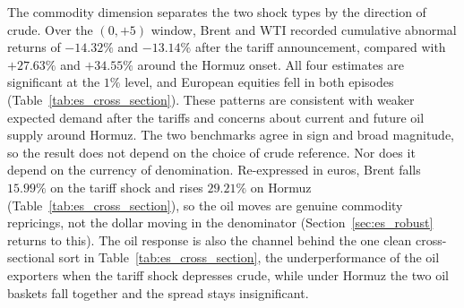 The commodity dimension separates the two shock types by the direction of crude. Over the $(0,+5)$ window, Brent and WTI recorded cumulative abnormal returns of $-14.32\%$ and $-13.14\%$ after the tariff announcement, compared with $+27.63\%$ and $+34.55\%$ around the Hormuz onset. All four estimates are significant at the $1\%$ level, and European equities fell in both episodes (Table~\ref{tab:es_cross_section}). These patterns are consistent with weaker expected demand after the tariffs and concerns about current and future oil supply around Hormuz. The two benchmarks agree in sign and broad magnitude, so the result does not depend on the choice of crude reference.
Nor does it depend on the currency of denomination. Re-expressed in euros, Brent falls
$15.99\%$ on the tariff shock and rises $29.21\%$ on Hormuz
(Table~\ref{tab:es_cross_section}), so the oil moves are genuine commodity repricings,
not the dollar moving in the denominator (Section~\ref{sec:es_robust} returns to this). The oil response is also the channel behind
the one clean cross-sectional sort in Table~\ref{tab:es_cross_section}, the underperformance
of the oil exporters when the tariff shock depresses crude, while under Hormuz the two oil
baskets fall together and the spread stays insignificant.


